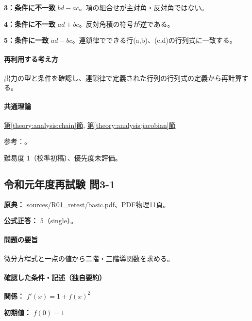 \noindent\textbf{3：条件に不一致} \(bd-ac\)。項の組合せが主対角・反対角ではない。\par

\noindent\textbf{4：条件に不一致} \(ad+bc\)。反対角積の符号が逆である。\par

\noindent\textbf{5：条件に一致} \(ad-bc\)。連鎖律でできる行(a,b)、(c,d)の行列式に一致する。\par

\paragraph{再利用する考え方} 出力の型と条件を確認し、連鎖律で定義された行列の行列式の定義から再計算する。

\paragraph{共通理論} \hyperref[theory:analysis:chain]{第\ref*{theory:analysis:chain}節}, \hyperref[theory:analysis:jacobian]{第\ref*{theory:analysis:jacobian}節}

\par 参考：\cite{mit_chain2007}。

\par 難易度 1（校準初稿）、優先度未評価。

\subsection{令和元年度再試験 問3-1}
\label{q:r01-ret-basic-3-1}

\noindent\textbf{原典：} sources/R01\_retest/basic.pdf、PDF物理11頁。

\textbf{公式正答：} 5（single）。

\paragraph{問題の要旨} 微分方程式と一点の値から二階・三階導関数を求める。

\paragraph{確認した条件・記述（独自要約）}\mbox{}\par

\noindent\textbf{関係：} \(f'(x)=1+f(x)^2\)\par

\noindent\textbf{初期値：} \(f(0)=1\)\par

